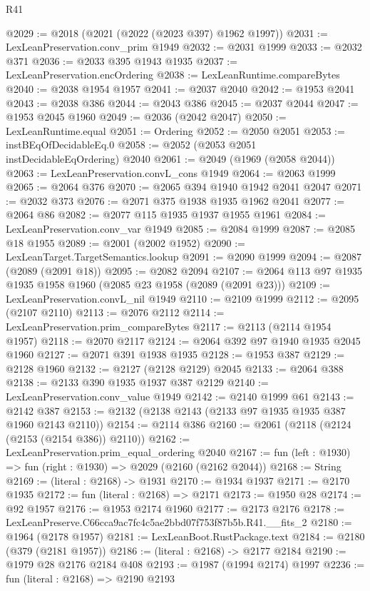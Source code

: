 \begin{lexlean}{R41}
\begin{coremodule}
@2029 := @2018 (@2021 (@2022 (@2023 @397) @1962 @1997))
@2031 := LexLeanPreservation.conv_prim @1949
@2032 := @2031 @1999
@2033 := @2032 @371
@2036 := @2033 @395 @1943 @1935
@2037 := LexLeanPreservation.encOrdering
@2038 := LexLeanRuntime.compareBytes
@2040 := @2038 @1954 @1957
@2041 := @2037 @2040
@2042 := @1953 @2041
@2043 := @2038 @386
@2044 := @2043 @386
@2045 := @2037 @2044
@2047 := @1953 @2045 @1960
@2049 := @2036 (@2042 @2047)
@2050 := LexLeanRuntime.equal
@2051 := Ordering
@2052 := @2050 @2051
@2053 := instBEqOfDecidableEq.{0}
@2058 := @2052 (@2053 @2051 instDecidableEqOrdering) @2040
@2061 := @2049 (@1969 (@2058 @2044))
@2063 := LexLeanPreservation.convL_cons @1949
@2064 := @2063 @1999
@2065 := @2064 @376
@2070 := @2065 @394 @1940 @1942 @2041 @2047
@2071 := @2032 @373
@2076 := @2071 @375 @1938 @1935 @1962 @2041
@2077 := @2064 @86
@2082 := @2077 @115 @1935 @1937 @1955 @1961
@2084 := LexLeanPreservation.conv_var @1949
@2085 := @2084 @1999
@2087 := @2085 @18 @1955
@2089 := @2001 (@2002 @1952)
@2090 := LexLeanTarget.TargetSemantics.lookup
@2091 := @2090 @1999
@2094 := @2087 (@2089 (@2091 @18))
@2095 := @2082 @2094
@2107 := @2064 @113 @97 @1935 @1935 @1958 @1960 (@2085 @23 @1958 (@2089 (@2091 @23)))
@2109 := LexLeanPreservation.convL_nil @1949
@2110 := @2109 @1999
@2112 := @2095 (@2107 @2110)
@2113 := @2076 @2112
@2114 := LexLeanPreservation.prim_compareBytes
@2117 := @2113 (@2114 @1954 @1957)
@2118 := @2070 @2117
@2124 := @2064 @392 @97 @1940 @1935 @2045 @1960
@2127 := @2071 @391 @1938 @1935
@2128 := @1953 @387
@2129 := @2128 @1960
@2132 := @2127 (@2128 @2129) @2045
@2133 := @2064 @388
@2138 := @2133 @390 @1935 @1937 @387 @2129
@2140 := LexLeanPreservation.conv_value @1949
@2142 := @2140 @1999 @61
@2143 := @2142 @387
@2153 := @2132 (@2138 @2143 (@2133 @97 @1935 @1935 @387 @1960 @2143 @2110))
@2154 := @2114 @386
@2160 := @2061 (@2118 (@2124 (@2153 (@2154 @386)) @2110))
@2162 := LexLeanPreservation.prim_equal_ordering @2040
@2167 := fun (left : @1930) => fun (right : @1930) => @2029 (@2160 (@2162 @2044))
@2168 := String
@2169 := (literal : @2168) -> @1931
@2170 := @1934 @1937
@2171 := @2170 @1935
@2172 := fun (literal : @2168) => @2171
@2173 := @1950 @28
@2174 := @92 @1957
@2176 := @1953 @2174 @1960
@2177 := @2173 @2176
@2178 := LexLeanPreserve.C66cca9ac7fc4c5ae2bbd07f753f87b5b.R41.__fits_2
@2180 := @1964 (@2178 @1957)
@2181 := LexLeanBoot.RustPackage.text
@2184 := @2180 (@379 (@2181 @1957))
@2186 := (literal : @2168) -> @2177 @2184
@2190 := @1979 @28 @2176 @2184 @408
@2193 := @1987 (@1994 @2174) @1997
@2236 := fun (literal : @2168) =>
  @2190
    @2193

\end{coremodule}
\end{lexlean}

